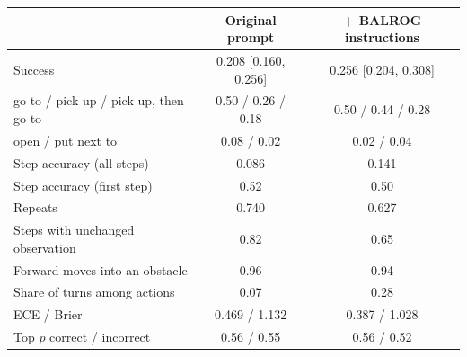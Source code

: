 \begin{tabular}{l c c}
    \toprule
     & Original prompt & + BALROG instructions \\
    \midrule
    Success & 0.208 [0.160, 0.256] & 0.256 [0.204, 0.308] \\
    \rowcolor{gray!10}\quad go to / pick up / pick up, then go to & 0.50 / 0.26 / 0.18 & 0.50 / 0.44 / 0.28 \\
    \quad open / put next to & 0.08 / 0.02 & 0.02 / 0.04 \\
    \rowcolor{gray!10}Step accuracy (all steps) & 0.086 & 0.141 \\
    Step accuracy (first step) & 0.52 & 0.50 \\
    \rowcolor{gray!10}Repeats & 0.740 & 0.627 \\
    Steps with unchanged observation & 0.82 & 0.65 \\
    \rowcolor{gray!10}Forward moves into an obstacle & 0.96 & 0.94 \\
    Share of turns among actions & 0.07 & 0.28 \\
    \rowcolor{gray!10}ECE / Brier & 0.469 / 1.132 & 0.387 / 1.028 \\
    Top $p$ correct / incorrect & 0.56 / 0.55 & 0.56 / 0.52 \\
    \bottomrule
\end{tabular}
